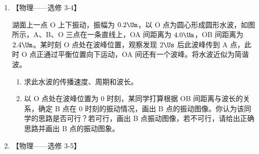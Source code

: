 \documentclass[\gkver]{gaokaozhenti}
\begin{document}
\begin{enumerate}

\item
【物理——选修 3-4】

湖面上一点 O 上下振动，振幅为 $0.2\Um$，以 O 点为圆心形成圆形水波，如图所示，A、B、O 三点在一条直线上，OA 间距离为 $4.0\Um$，OB 间距离为 $2.4\Um$。某时刻 O 点处在波峰位置，观察发现 $2\Us$ 后此波峰传到 A 点，此时 O 点正通过平衡位置向下运动，OA 间还有一个波峰。将水波近似为简谐波。

\begin{enumerate}
	\item
	求此水波的传播速度、周期和波长。
	\item
	以 O 点处在波峰位置为 0 时刻，某同学打算根据 OB 间距离与波长的关系，确定 B 点在 0 时刻的振动情况，画出 B 点的振动图像。你认为该同学的思路是否可行？若可行，画出 B 点振动图像，若不可行，请给出正确思路并画出 B 点的振动图象。
\end{enumerate}




\item
【物理——选修 3-5】


\end{enumerate}
\end{document}
